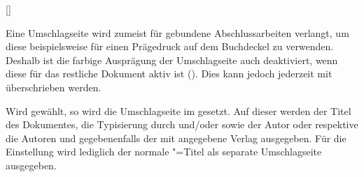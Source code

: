 \begin{Declaration*}{}
\begin{Declaration*}{}
\begin{Declaration*}{}
\begin{Declaration}{[]}
\begin{Declaration}[v2.02]{%
}
\begin{Declaration}{}
\begin{Declaration}[v2.02]{}{%
}
\begin{Declaration}[v2.03]{}{%
}
\begin{Declaration}[v2.03]{}{%
}
\begin{Declaration}[v2.03]{%
}{}
\begin{Declaration}[v2.03]{%
}{}
\begin{Declaration}[v2.03]{}{%
}
\begin{Declaration}[v2.03]{}{%
}
\begin{Declaration}[v2.03]{}{%
}
\printdeclarationlist%
%
%
Eine Umschlagseite wird zumeist für gebundene Abschlussarbeiten verlangt, um 
diese beispielsweise für einen Prägedruck auf dem Buchdeckel zu verwenden. 
Deshalb ist die farbige Ausprägung der Umschlagseite auch deaktiviert, wenn 
diese für das restliche Dokument aktiv ist (). Dies kann 
jedoch jederzeit mit  überschrieben werden.

Wird  gewählt, so wird die Umschlagseite im \TUDCD 
gesetzt. Auf dieser werden der Titel des Dokumentes, die Typisierung 
durch  und/oder  sowie der Autor oder respektive 
die Autoren und gegebenenfalls der mit  angegebene Verlag 
ausgegeben.
Für die Einstellung  wird lediglich der normale 
\KOMAScript"=Titel als separate Umschlagseite ausgegeben. 


\end{Declaration}
\end{Declaration}
\end{Declaration}
\end{Declaration}
\end{Declaration}
\end{Declaration}
\end{Declaration}
\end{Declaration}
\end{Declaration}
\end{Declaration}
\end{Declaration}
\end{Declaration*}
\end{Declaration*}
\end{Declaration*}
